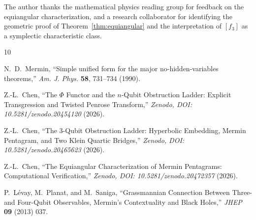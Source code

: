 \documentclass[11pt,a4paper]{article}
\theoremstyle{remark}
\begin{document}
The author thanks the mathematical physics reading group for feedback
on the equiangular characterization, and a research collaborator for
identifying the geometric proof of Theorem~\ref{thm:equiangular} and
the interpretation of $[f_3]$ as a symplectic characteristic class.

\begin{thebibliography}{10}

N.~D.~Mermin,
``Simple unified form for the major no-hidden-variables theorems,''
\textit{Am. J. Phys.} \textbf{58}, 731--734 (1990).

Z.-L.~Chen,
``The $\Phi$ Functor and the $n$-Qubit Obstruction Ladder:
Explicit Transgression and Twisted Penrose Transform,''
\textit{Zenodo, DOI: 10.5281/zenodo.20454120} (2026).

Z.-L.~Chen,
``The 3-Qubit Obstruction Ladder: Hyperbolic Embedding,
Mermin Pentagram, and Two Klein Quartic Bridges,''
\textit{Zenodo, DOI: 10.5281/zenodo.20465623} (2026).

Z.-L.~Chen,
``The Equiangular Characterization of Mermin Pentagrams:
Computational Verification,''
\textit{Zenodo, DOI: 10.5281/zenodo.20472357} (2026).

P.~L\'evay, M.~Planat, and M.~Saniga,
``Grassmannian Connection Between Three- and Four-Qubit Observables,
Mermin's Contextuality and Black Holes,''
\textit{JHEP} \textbf{09} (2013) 037.

\end{thebibliography}
\end{document}
